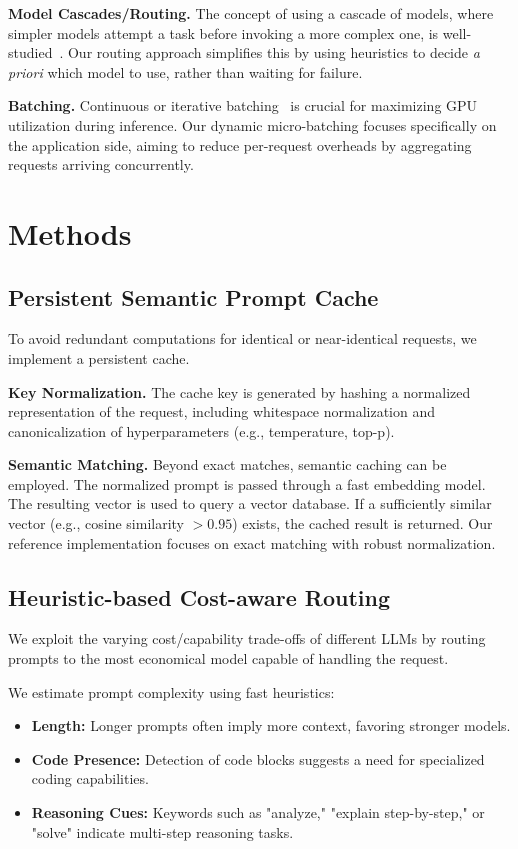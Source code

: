 \documentclass[11pt]{article}
\begin{document}
\noindent\textbf{Model Cascades/Routing.} The concept of using a cascade of models, where simpler models attempt a task before invoking a more complex one, is well-studied~\cite{chen2023frugalgpt}. Our routing approach simplifies this by using heuristics to decide \emph{a priori} which model to use, rather than waiting for failure.

\noindent\textbf{Batching.} Continuous or iterative batching~\cite{pope2022efficiently} is crucial for maximizing GPU utilization during inference. Our dynamic micro-batching focuses specifically on the application side, aiming to reduce per-request overheads by aggregating requests arriving concurrently.

\section{Methods}

\subsection{Persistent Semantic Prompt Cache}
To avoid redundant computations for identical or near-identical requests, we implement a persistent cache.

\noindent\textbf{Key Normalization.} The cache key is generated by hashing a normalized representation of the request, including whitespace normalization and canonicalization of hyperparameters (e.g., temperature, top-p).

\noindent\textbf{Semantic Matching.} Beyond exact matches, semantic caching can be employed. The normalized prompt is passed through a fast embedding model. The resulting vector is used to query a vector database. If a sufficiently similar vector (e.g., cosine similarity $>0.95$) exists, the cached result is returned. Our reference implementation focuses on exact matching with robust normalization.

\subsection{Heuristic-based Cost-aware Routing}
We exploit the varying cost/capability trade-offs of different LLMs by routing prompts to the most economical model capable of handling the request.

We estimate prompt complexity using fast heuristics:
\begin{itemize}
    \item \textbf{Length:} Longer prompts often imply more context, favoring stronger models.
    \item \textbf{Code Presence:} Detection of code blocks suggests a need for specialized coding capabilities.
    \item \textbf{Reasoning Cues:} Keywords such as "analyze," "explain step-by-step," or "solve" indicate multi-step reasoning tasks.
\end{itemize}
\end{document}
